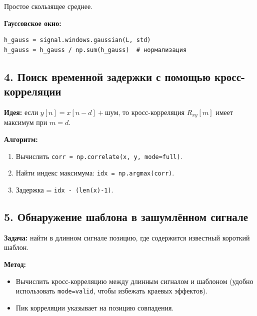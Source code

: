 \documentclass[12pt,a4paper,openany]{book}
\providecommand{\tightlist}{\setlength{\itemsep}{0pt}\setlength{\parskip}{0pt}}
\begin{document}
Простое скользящее среднее.

\textbf{Гауссовское окно:}

\begin{Verbatim}[fontsize=\small, breaklines, breakanywhere]
h_gauss = signal.windows.gaussian(L, std)
h_gauss = h_gauss / np.sum(h_gauss)  # нормализация
\end{Verbatim}

\subsection*{4. Поиск временной задержки с помощью кросс-корреляции}

\textbf{Идея:} если \(y[n] = x[n-d] + \text{шум}\), то кросс-корреляция \(R_{xy}[m]\) имеет максимум при \(m = d\).

\textbf{Алгоритм:}

\begin{enumerate}
\def\labelenumi{\arabic{enumi}.}
\tightlist
\item
  Вычислить \texttt{corr\ =\allowbreak{}\ np.\allowbreak{}correlate(\allowbreak{}x,\allowbreak{}\ y,\allowbreak{}\ mode=\allowbreak{}\textquotesingle{}\allowbreak{}full\textquotesingle{}\allowbreak{})}.
\item
  Найти индекс максимума: \texttt{idx\ =\allowbreak{}\ np.\allowbreak{}argmax(\allowbreak{}corr)}.
\item
  Задержка = \texttt{idx\ -\ (\allowbreak{}len(\allowbreak{}x)-1)}.
\end{enumerate}

\subsection*{5. Обнаружение шаблона в зашумлённом сигнале}

\textbf{Задача:} найти в длинном сигнале позицию, где содержится известный короткий шаблон.

\textbf{Метод:}

\begin{itemize}
\tightlist
\item
  Вычислить кросс-корреляцию между длинным сигналом и шаблоном (удобно использовать \texttt{mode=\allowbreak{}\textquotesingle{}\allowbreak{}valid\textquotesingle{}\allowbreak{}}, чтобы избежать краевых эффектов).
\item
  Пик корреляции указывает на позицию совпадения.
\end{itemize}
\end{document}
